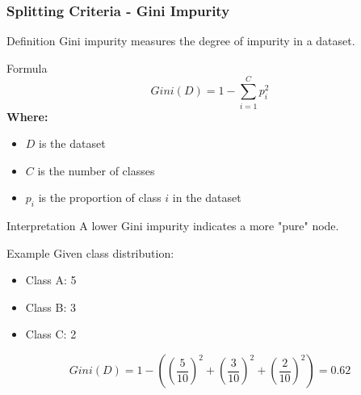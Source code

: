 \documentclass[aspectratio=169]{beamer}
\begin{document}
\begin{frame}[fragile]
    \frametitle{Splitting Criteria - Gini Impurity}
    \begin{block}{Definition}
        Gini impurity measures the degree of impurity in a dataset.
    \end{block}
    
    \begin{block}{Formula}
        \begin{equation}
            Gini(D) = 1 - \sum_{i=1}^{C} p_i^2
        \end{equation}
        \textbf{Where:}
        \begin{itemize}
            \item \( D \) is the dataset
            \item \( C \) is the number of classes
            \item \( p_i \) is the proportion of class \( i \) in the dataset
        \end{itemize}
    \end{block}
    
    \begin{block}{Interpretation}
        A lower Gini impurity indicates a more "pure" node.
    \end{block}
    
    \begin{block}{Example}
        Given class distribution:
        \begin{itemize}
            \item Class A: 5
            \item Class B: 3
            \item Class C: 2
        \end{itemize}
        \[
        Gini(D) = 1 - \left( \left(\frac{5}{10}\right)^2 + \left(\frac{3}{10}\right)^2 + \left(\frac{2}{10}\right)^2 \right) = 0.62
        \]
    \end{block}
\end{frame}
\end{document}
